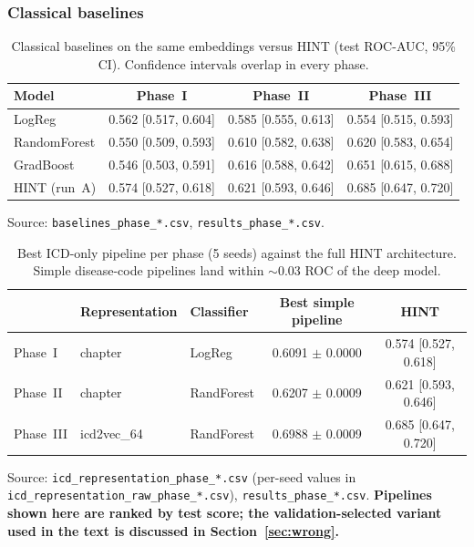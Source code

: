 \documentclass[a4paper,fleqn]{cas-sc}
\begin{document}
\subsubsection{Classical baselines}
\label{sec:baselines}
\begin{table}[t]
\centering
\small
\caption{Classical baselines on the same embeddings versus HINT (test ROC-AUC, 95\% CI). Confidence intervals overlap in every phase.}
\label{tab:baselines}
\begin{tabular}{lccc}
\toprule
Model & Phase~I & Phase~II & Phase~III \\
\midrule
LogReg & 0.562 {\scriptsize [0.517, 0.604]} & 0.585 {\scriptsize [0.555, 0.613]} & 0.554 {\scriptsize [0.515, 0.593]} \\
RandomForest & 0.550 {\scriptsize [0.509, 0.593]} & 0.610 {\scriptsize [0.582, 0.638]} & 0.620 {\scriptsize [0.583, 0.654]} \\
GradBoost & 0.546 {\scriptsize [0.503, 0.591]} & 0.616 {\scriptsize [0.588, 0.642]} & 0.651 {\scriptsize [0.615, 0.688]} \\
HINT (run~A) & 0.574 {\scriptsize [0.527, 0.618]} & 0.621 {\scriptsize [0.593, 0.646]} & 0.685 {\scriptsize [0.647, 0.720]} \\
\bottomrule
\end{tabular}
\begin{minipage}{\linewidth}\vspace{2pt}\scriptsize Source: \texttt{baselines\_phase\_*.csv}, \texttt{results\_phase\_*.csv}. \end{minipage}
\end{table}
\begin{table}[t]
\centering
\small
\caption{Best ICD-only pipeline per phase (5 seeds) against the full HINT architecture. Simple disease-code pipelines land within $\sim$0.03 ROC of the deep model.}
\label{tab:icd}
\begin{tabular}{lllcc}
\toprule
 & Representation & Classifier & Best simple pipeline & HINT \\
\midrule
Phase~I & chapter & LogReg & 0.6091 $\pm$ 0.0000 & 0.574 {\scriptsize [0.527, 0.618]} \\
Phase~II & chapter & RandForest & 0.6207 $\pm$ 0.0009 & 0.621 {\scriptsize [0.593, 0.646]} \\
Phase~III & icd2vec\_64 & RandForest & 0.6988 $\pm$ 0.0009 & 0.685 {\scriptsize [0.647, 0.720]} \\
\bottomrule
\end{tabular}
\begin{minipage}{\linewidth}\vspace{2pt}\scriptsize Source: \texttt{icd\_representation\_phase\_*.csv} (per-seed values in \texttt{icd\_representation\_raw\_phase\_*.csv}), \texttt{results\_phase\_*.csv}. \textbf{Pipelines shown here are ranked by test score; the validation-selected variant used in the text is discussed in Section~\ref{sec:wrong}.} \end{minipage}
\end{table}
\end{document}
